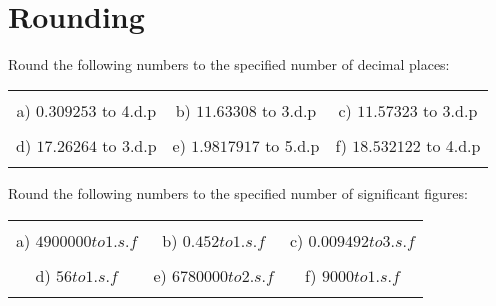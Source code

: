 \documentclass[12pt]{article}
\begin{document}
\pagestyle{fancy}
\\
\fancyfoot{} 
\section{Rounding}
Round the following numbers to the specified number of decimal places:
\begin{table}[h!]
\centering
\begin{tabular}{c c c}
\hspace{4cm} & \hspace{4cm} & \hspace{4cm} \\
a) ${0}.{3}{0}{9}{2}{5}{3}$ to 4.d.p & b) ${11}.{6}{3}{3}{0}{8}$ to 3.d.p & c) ${11}.{5}{7}{3}{2}{3}$ to 3.d.p\\ \\
d) ${17}.{2}{6}{2}{6}{4}$ to 3.d.p & e) ${1}.{9}{8}{1}{7}{9}{1}{7}$ to 5.d.p & f) ${18}.{5}{3}{2}{1}{2}{2}$ to 4.d.p\\ \\
\end{tabular}
\end{table}
\newline
Round the following numbers to the specified number of significant figures:
\begin{table}[h!]
\centering
\begin{tabular}{c c c}
\hspace{4cm} & \hspace{4cm} & \hspace{4cm} \\
a) $4900000 to 1.s.f$ & b) $0.452 to 1.s.f$ & c) $0.009492 to 3.s.f$\\ \\
d) $56 to 1.s.f$ & e) $6780000 to 2.s.f$ & f) $9000 to 1.s.f$\\ \\
\end{tabular}
\end{table}
\newline
\end{document}
